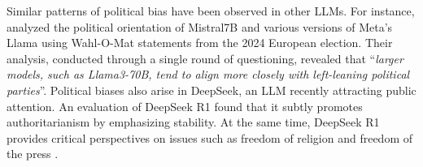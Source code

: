 Similar patterns of political bias have been observed in other LLMs.
For instance, \cite{rettenberger2024assessing} analyzed the political orientation of Mistral7B and various versions of Meta's Llama using Wahl-O-Mat statements from the 2024 European election.
Their analysis, conducted through a single round of questioning, revealed that \enquote{\itshape larger models, such as Llama3-70B, tend to align more closely with left-leaning political parties}.
Political biases also arise in DeepSeek, an LLM recently attracting public attention.
An evaluation of DeepSeek R1 found that it subtly promotes authoritarianism by emphasizing stability.
At the same time, DeepSeek R1 provides critical perspectives on issues such as freedom of religion and freedom of the press \citep{gupta2025comparative}.


